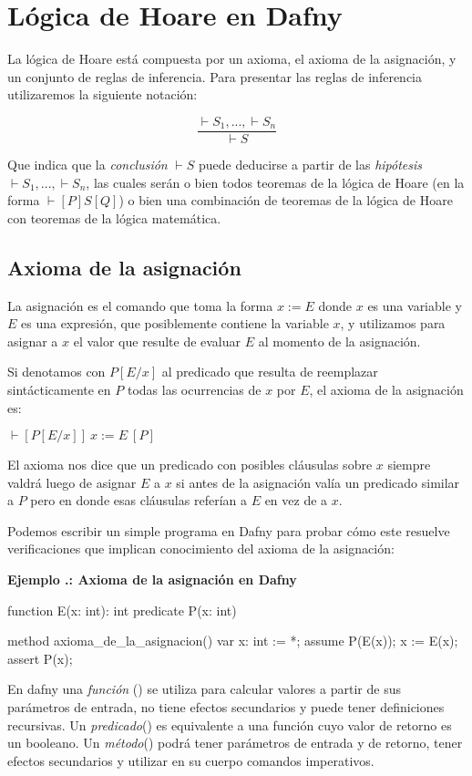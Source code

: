 \documentclass[12pt, a4paper, openany, fleqn]{book}
\newcounter{example}[chapter]
\renewcommand{\theexample}{\thechapter.\arabic{example}}
\newcommand{\example}[1]{
  \refstepcounter{example} %
  \vspace{1em}
  \noindent\textbf{Ejemplo \theexample: #1}
}
\newcommand{\hoareTheorem}[3]{\ensuremath{\vdash[#1]\ #2\ [#3]}}
\newcommand{\inferenceRule}[2]{
    \begin{equation*}
        \frac{#1}{#2}
    \end{equation*}
}
\begin{document}
    \section{Lógica de Hoare en Dafny}
    La lógica de Hoare está compuesta por un axioma, el axioma de la asignación, y un conjunto de reglas de inferencia. Para presentar las reglas de inferencia utilizaremos la siguiente notación:
    \inferenceRule{\vdash S_1, ..., \vdash S_n}{\vdash S}
    Que indica que la \textit{conclusión} $\vdash S$ puede deducirse a partir de las \textit{hipótesis} $\vdash S_1, ..., \vdash S_n$, las cuales serán o bien todos teoremas de la lógica de Hoare (en la forma $\vdash[P]S[Q]$) o bien una combinación de teoremas de la lógica de Hoare con teoremas de la lógica matemática.

    \subsection{Axioma de la asignación}
    La asignación es el comando que toma la forma $x := E$ donde $x$ es una variable y $E$ es una expresión, que posiblemente contiene la variable $x$, y utilizamos para asignar a $x$ el valor que resulte de evaluar $E$ al momento de la asignación.

    Si denotamos con $P[E/x]$ al predicado que resulta de reemplazar sintácticamente en $P$ todas las ocurrencias de $x$ por $E$, el axioma de la asignación es:

    \begin{center}
        \hoareTheorem{P[E/x]}{x:=E}{P}
    \end{center}

    El axioma nos dice que un predicado con posibles cláusulas sobre $x$ siempre valdrá  luego de asignar $E$ a $x$ si antes de la asignación valía un predicado similar a $P$ pero en donde esas cláusulas referían a $E$ en vez de a $x$.

    Podemos escribir un simple programa en Dafny para probar cómo este resuelve verificaciones que implican conocimiento del axioma de la asignación:

    \example{Axioma de la asignación en Dafny}
    \begin{dafny}
function E(x: int): int
predicate P(x: int)

method axioma_de_la_asignacion()
{
    var x: int := *;
    assume P(E(x));
    x := E(x);
    assert P(x);
}
    \end{dafny}

    En dafny una \textit{función} () se utiliza para calcular valores a partir de sus parámetros de entrada, no tiene efectos secundarios y puede tener definiciones recursivas. Un \textit{predicado}() es equivalente a una función cuyo valor de retorno es un booleano. Un \textit{método}() podrá tener parámetros de entrada y de retorno, tener efectos secundarios y utilizar en su cuerpo comandos imperativos.
\end{document}
